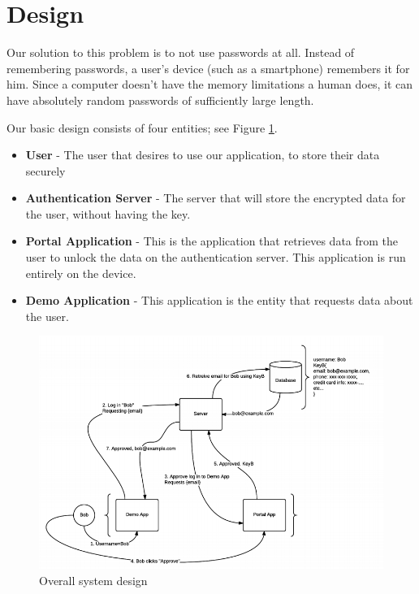 \documentclass[letterpaper,twocolumn,10pt]{article}
\begin{document}
\section{Design}

Our solution to this problem is to not use passwords at all. Instead of remembering passwords, a user's device (such as a smartphone) remembers it for him. Since a computer doesn't have the memory limitations a human does, it can have absolutely random passwords of sufficiently large length. 

Our basic design consists of four entities; see Figure \ref{design}.
\begin{itemize}
    \item \textbf{User} - The user that desires to use our application, to store their data securely
    \item \textbf{Authentication Server} - The server that will store the encrypted data for the user, without having the key.
    \item \textbf{Portal Application} - This is the application that retrieves data from the user to unlock the data on the authentication server. This application is run entirely on the device.
    \item \textbf{Demo Application} - This application is the entity that requests data about the user.
\end{itemize}

\begin{figure}[ht]
\centering
\includegraphics[width=.95\textwidth]{Design}
\caption{Overall system design}
\label{design}
\end{figure}
\end{document}
